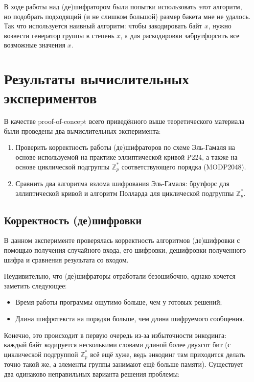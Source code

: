 \documentclass[a4paper,14pt]{extarticle}
\begin{document}
В ходе работы над (де)шифратором были попытки использовать этот алгоритм, но
подобрать подходящий (и не слишком большой) размер бакета мне не удалось. Так
что используется наивный алгоритм: чтобы закодировать байт $x$, нужно возвести
генератор группы в степень $x$, а для раскодировки забрутфорсить все возможные
значения $x$.

\newpage

\section{Результаты вычислительных экспериментов}

В качестве proof-of-concept всего приведённого выше теоретического материала
были проведены два вычислительных эксперимента:

\begin{enumerate}
    \item Проверить корректность работы (де)шифраторов по схеме Эль-Гамаля на
        основе используемой на практике эллиптической кривой P224, а также на
        основе циклической подгруппы $\mathbb{Z}_p^*$ соответствующего порядка
        (MODP2048).
    \item Сравнить два алгоритма взлома шифрования Эль-Гамаля: брутфорс для
        эллиптической кривой и алгоритм Полларда для циклической подгруппы
        $\mathbb{Z}_p^*$.
\end{enumerate}

\subsection{Корректность (де)шифровки}

В данном эксперименте проверялась корректность алгоритмов (де)шифровки с помощью
получения случайного входа, его шифровки, дешифровки полученного шифра и
сравнения результата со входом.

Неудивительно, что (де)шифраторы отработали безошибочно, однако хочется заметить
следующее:

\begin{itemize}
    \item Время работы программы ощутимо больше, чем у готовых решений;
    \item Длина шифротекста на порядки больше, чем длина шифруемого сообщения.
\end{itemize}

Конечно, это происходит в первую очередь из-за избыточности энкодинга: каждый
байт кодируется несколькими словами длиной более двухсот бит (с циклической
подгруппой $\mathbb{Z}_p^*$ всё ещё хуже, ведь энкодинг там приходится делать
точно такой же, а элементы группы занимают ещё больше памяти). Существует два
одинаково неправильных варианта решения проблемы:
\end{document}
